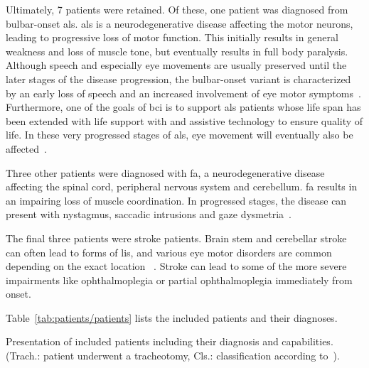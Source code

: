 Ultimately, 7 patients were retained.
Of these, one patient was diagnosed from bulbar-onset \ac{als}.
\ac{als} is a neurodegenerative disease affecting the motor neurons, leading to
progressive loss of motor function.
This initially results in general weakness and loss of muscle tone, but
eventually results in full body paralysis.
Although speech and especially eye movements are usually preserved until the
later stages of the disease progression, the bulbar-onset variant is
characterized by an early loss of speech and an increased involvement of eye
motor symptoms~\cite{Guo2022}.
Furthermore, one of the goals of \ac{bci} is to support \ac{als} patients whose
life span has been extended with life support with and assistive technology to
ensure quality of life.
In these very progressed stages of \ac{als}, eye movement will eventually also
be affected~\cite{Hayashi1991}.

Three other patients were diagnosed with \ac{fa}, a neurodegenerative
disease affecting the
spinal cord, peripheral nervous system and cerebellum.
\ac{fa} results in an impairing loss of muscle coordination.
In progressed stages, the disease can present with nystagmus, saccadic
intrusions and gaze dysmetria~\cite{Cook2017}.

The final three patients were stroke patients.
Brain stem and cerebellar stroke can often lead to forms of \ac{lis}, and
various eye motor disorders are common depending on the exact location
~\cite{Bogousslavsky1987, Moncayo2009}.
Stroke can lead to some of the more severe impairments like ophthalmoplegia or
partial ophthalmoplegia immediately from onset.

Table~\ref{tab:patients/patients} lists the included patients and their
diagnoses.


\begin{table}[t]
  \centering
  \footnotesize
  
  \caption[Presentation of included patients including their diagnosis and
  capabilities.]{Presentation of included patients including their diagnosis and
  capabilities.
  (Trach.: patient underwent a tracheotomy, Cls.: classification according
  to~\textcite{Wolpaw2006}).
  }
  \label{tab:patients/patients}
\end{table}

